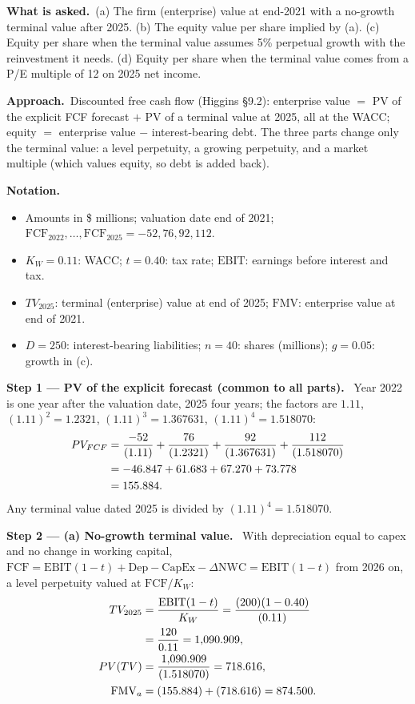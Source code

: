 \documentclass[11pt,a4paper]{article}
\numberwithin{equation}{section}
\newcommand{\step}[2]{\par\medskip\noindent\textbf{Step #1 --- #2.}~}
\newenvironment{notation}{\par\noindent\textbf{Notation.}\begin{itemize}[leftmargin=1.4em]}{\end{itemize}}
\newcommand{\asked}{\par\medskip\noindent\textbf{What is asked.}~}
\newcommand{\approach}{\par\smallskip\noindent\textbf{Approach.}~}
\begin{document}
\asked (a) The firm (enterprise) value at end-2021 with a no-growth terminal value after 2025.
(b) The equity value per share implied by (a). (c) Equity per share when the terminal value
assumes 5\% perpetual growth with the reinvestment it needs. (d) Equity per share when the
terminal value comes from a P/E multiple of 12 on 2025 net income.

\approach Discounted free cash flow (Higgins \S9.2): enterprise value $=$ PV of the explicit FCF
forecast $+$ PV of a terminal value at 2025, all at the WACC; equity $=$ enterprise value $-$
interest-bearing debt. The three parts change only the terminal value: a level perpetuity, a
growing perpetuity, and a market multiple (which values equity, so debt is added back).

\begin{notation}
  \item Amounts in \$ millions; valuation date end of 2021; $\mathrm{FCF}_{2022},\dots,\mathrm{FCF}_{2025}=-52,76,92,112$.
  \item $K_W=0.11$: WACC; $t=0.40$: tax rate; $\mathrm{EBIT}$: earnings before interest and tax.
  \item $TV_{2025}$: terminal (enterprise) value at end of 2025; $\mathrm{FMV}$: enterprise value at end of 2021.
  \item $D=250$: interest-bearing liabilities; $n=40$: shares (millions); $g=0.05$: growth in (c).
\end{notation}

\step{1}{PV of the explicit forecast (common to all parts)} Year 2022 is one year after the
valuation date, 2025 four years; the factors are $1.11$, $(1.11)^2=1.2321$,
$(1.11)^3=1.367631$, $(1.11)^4=1.518070$:
\begin{align}
  PV_{FCF} &= \frac{-52}{(1.11)} + \frac{76}{(1.2321)} + \frac{92}{(1.367631)} + \frac{112}{(1.518070)} \notag\\
           &= -46.847 + 61.683 + 67.270 + 73.778 \notag\\
           &= 155.884. \label{eq:12pv}
\end{align}
Any terminal value dated 2025 is divided by $(1.11)^4 = 1.518070$.

\step{2}{(a) No-growth terminal value} With depreciation equal to capex and no change in
working capital, $\mathrm{FCF}=\mathrm{EBIT}(1-t)+\mathrm{Dep}-\mathrm{CapEx}-\Delta\mathrm{NWC}=\mathrm{EBIT}(1-t)$
from 2026 on, a level perpetuity valued at $\mathrm{FCF}/K_W$:
\begin{align}
  TV_{2025} &= \frac{\mathrm{EBIT}(1-t)}{K_W} = \frac{(200)(1-0.40)}{(0.11)} \notag\\
            &= \frac{120}{0.11} = 1{,}090.909, \notag\\
  PV(TV) &= \frac{1{,}090.909}{(1.518070)} = 718.616, \notag\\
  \mathrm{FMV}_a &= (155.884) + (718.616) = 874.500. \label{eq:12a}
\end{align}
\end{document}
